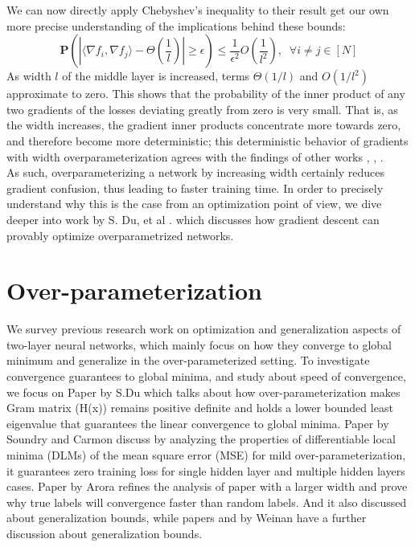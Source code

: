 \documentclass{article}
\begin{document}
We can now directly apply Chebyshev's inequality to their result get our own more precise understanding of the implications behind these bounds:
$$\boxed{\mathbf{P}\left( \left\lvert \langle \nabla f_i, \nabla f_j \rangle - \Theta(\frac{1}{l}) \right\rvert \geq \epsilon  \right) \leq \frac{1}{\epsilon^2}O(\frac{1}{l^2}), \;\; \forall i \not = j \in [N]}$$
As width $l$ of the middle layer is increased, terms $\Theta(1/l)$ and $O(1/l^2)$ approximate to zero. This shows that the probability of the inner product of any two gradients of the losses deviating greatly from zero is very small. That is, as the width increases, the gradient inner products concentrate more towards zero, and therefore become more deterministic; this deterministic behavior of gradients with width overparameterization agrees with the findings of other works \cite{oymak}, \cite{bassily}, \cite{SimonDu}.\\

As such, overparameterizing a network by increasing width certainly reduces gradient confusion, thus leading to faster training time. In order to precisely understand why this is the case from an optimization point of view, we dive deeper into work by S. Du, et al \cite{SimonDu}. which discusses how gradient descent can provably optimize overparametrized networks.

\section{Over-parameterization}
We survey previous research work on optimization and generalization aspects of two-layer neural networks, which mainly focus on how they converge to global minimum and generalize in the over-parameterized setting. To investigate convergence guarantees to global minima, and study about speed of convergence, we focus on Paper \cite{SimonDu} by S.Du which talks about how over-parameterization makes Gram matrix (H(x)) remains positive definite and holds a lower bounded least eigenvalue that guarantees the linear convergence to global minima. Paper \cite{SoudryCarmon} by Soundry and Carmon discuss by analyzing the properties of differentiable local minima (DLMs) of the mean square error (MSE) for mild over-parameterization, it guarantees zero training loss for single hidden layer and multiple hidden layers cases. Paper \cite{Arora} by Arora refines the analysis of paper \cite{SimonDu} with a larger width and prove why true labels will convergence faster than random labels. And it also discussed about generalization bounds, while papers \cite{Weinan1} and \cite{Weinan2} by Weinan have a further discussion about generalization bounds. 
\end{document}
